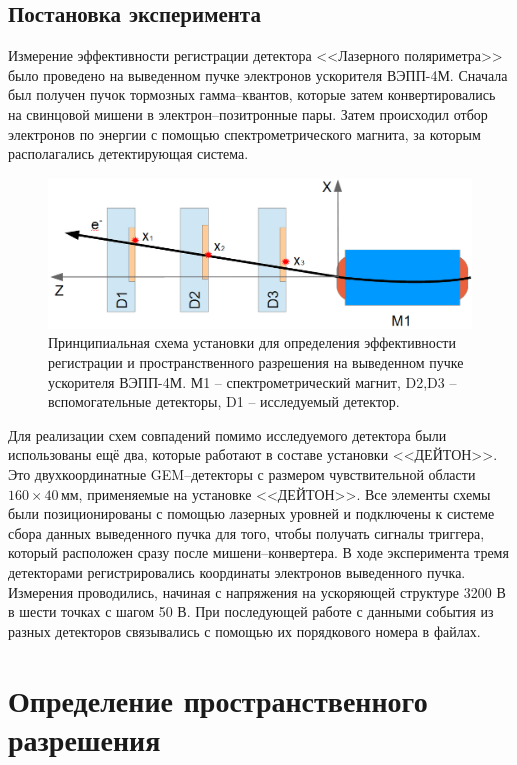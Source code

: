 \subsection{Постановка эксперимента}
Измерение эффективности регистрации детектора <<Лазерного поляриметра>> было проведено на выведенном пучке электронов ускорителя ВЭПП-4М. Сначала был получен пучок тормозных гамма--квантов, которые затем конвертировались на свинцовой мишени в электрон--позитронные пары. Затем происходил отбор электронов по энергии с помощью спектрометрического магнита, за которым располагались детектирующая система.
 \begin{figure}[h]
 	\centering
 	\includegraphics[width= 12cm]{img/reg_eff_exp_scheme.png}
 	\caption{Принципиальная схема установки для определения эффективности регистрации и пространственного разрешения на выведенном пучке ускорителя ВЭПП-4М. М1 -- спектрометрический магнит, D2,D3 -- вспомогательные детекторы, D1 -- исследуемый детектор.}
 	\label{fig:test_beam_scheme}
 \end{figure}
Для реализации схем совпадений помимо исследуемого детектора были использованы ещё два, которые работают в составе установки <<ДЕЙТОН>>. Это двухкоординатные GEM--детекторы с размером чувствительной области $160 \times 40$\,мм, применяемые на установке <<ДЕЙТОН>>. Все элементы схемы были позиционированы с помощью лазерных уровней и подключены к системе сбора данных выведенного пучка для того, чтобы получать сигналы триггера, который расположен сразу после мишени--конвертера. В ходе эксперимента тремя детекторами регистрировались координаты электронов выведенного пучка. Измерения проводились, начиная с напряжения на ускоряющей структуре 3200 В в шести точках с шагом 50 В. При последующей работе с данными события из разных детекторов связывались с помощью их порядкового номера в файлах. 

\section{Определение пространственного разрешения}